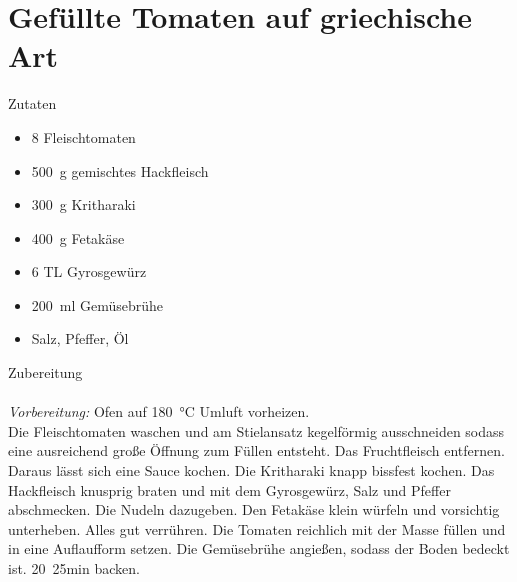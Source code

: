 \section*{Gefüllte Tomaten auf griechische Art}
\ihead{}\ohead{}
\cfoot{}
{\Large Zutaten}
\begin{multicols}{2}
\begin{itemize}
    \item \num{8} Fleischtomaten
    \item \SI{500}{g} gemischtes Hackfleisch
    \item \SI{300}{g} Kritharaki
    \item \SI{400}{g} Fetakäse
    \item \num{6} TL Gyrosgewürz
    \item \SI{200}{ml} Gemüsebrühe
    \item Salz, Pfeffer, Öl
\end{itemize}
\end{multicols}
\noindent
{\Large Zubereitung}\\
\\
\textit{Vorbereitung:} Ofen auf \SI{180}{\celsius} Umluft vorheizen.\\
Die Fleischtomaten waschen und am Stielansatz kegelförmig ausschneiden sodass eine ausreichend große Öffnung zum Füllen entsteht.
Das Fruchtfleisch entfernen. 
Daraus lässt sich eine Sauce kochen. 
Die Kritharaki knapp bissfest kochen. 
Das Hackfleisch knusprig braten und mit dem Gyrosgewürz, Salz und Pfeffer abschmecken.
Die Nudeln dazugeben. 
Den Fetakäse klein würfeln und vorsichtig unterheben. 
Alles gut verrühren. 
Die Tomaten reichlich mit der Masse füllen und in eine Auflaufform setzen. 
Die Gemüsebrühe angießen, sodass der Boden bedeckt ist. 
\SI{20}{25}{min} backen. 
